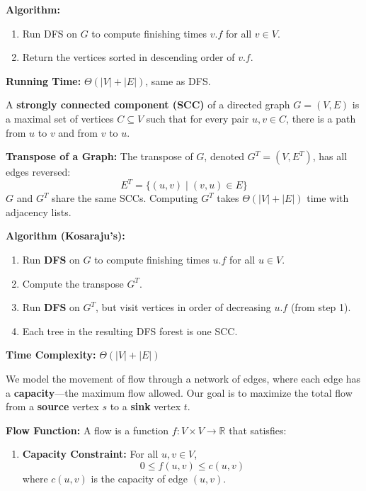 \documentclass[a4paper,landscape]{article}
\begin{document}
\begin{multicols}{7}
\textbf{Algorithm:}
\begin{enumerate}[noitemsep, topsep=0pt]
    \item Run DFS on $G$ to compute finishing times $v.f$ for all $v \in V$.
    \item Return the vertices sorted in descending order of $v.f$.
\end{enumerate}

\textbf{Running Time:} $\Theta(|V| + |E|)$, same as DFS.
\endtcolorbox

\tcolorbox[mybox={Strongly Connected Components}]
A \textbf{strongly connected component (SCC)} of a directed graph $G = (V, E)$ is a maximal set of vertices $C \subseteq V$ such that for every pair $u, v \in C$, there is a path from $u$ to $v$ and from $v$ to $u$.

\textbf{Transpose of a Graph:} The transpose of $G$, denoted $G^T = (V, E^T)$, has all edges reversed:
\[
E^T = \{(u, v) \mid (v, u) \in E\}
\]
$G$ and $G^T$ share the same SCCs. Computing $G^T$ takes $\Theta(|V| + |E|)$ time with adjacency lists.

\textbf{Algorithm (Kosaraju's):}
\begin{enumerate}[noitemsep, topsep=0pt]
    \item Run \textbf{DFS} on $G$ to compute finishing times $u.f$ for all $u \in V$.
    \item Compute the transpose $G^T$.
    \item Run \textbf{DFS} on $G^T$, but visit vertices in order of decreasing $u.f$ (from step 1).
    \item Each tree in the resulting DFS forest is one SCC.
\end{enumerate}

\textbf{Time Complexity:} $\Theta(|V| + |E|)$
\endtcolorbox

\tcolorbox[mybox={Flow Network}]
We model the movement of flow through a network of edges, where each edge has a \textbf{capacity}—the maximum flow allowed. Our goal is to maximize the total flow from a \textbf{source} vertex $s$ to a \textbf{sink} vertex $t$.

\textbf{Flow Function:} A flow is a function $f : V \times V \to \mathbb{R}$ that satisfies:

\begin{enumerate}[noitemsep, topsep=0pt]
    \item \textbf{Capacity Constraint:} For all $u, v \in V$,
    \[
    0 \leq f(u, v) \leq c(u, v)
    \]
    where $c(u, v)$ is the capacity of edge $(u, v)$.
    

\end{enumerate}
\end{multicols}
\end{document}
